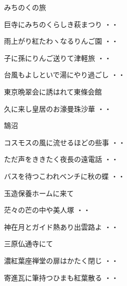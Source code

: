 \vspace{0.6cm}
みちのくの旅
\begin{shiika}巨寺にみちのくらしき萩まつり
\hfill{・・}\end{shiika}
\begin{shiika}雨上がり紅たわヽなるりんご園
\hfill{・・}\end{shiika}
\begin{shiika}子に孫にりんご送りて津軽旅
\hfill{・・}\end{shiika}
\begin{shiika}台風もよしといで湯にやり過ごし
\hfill{・・}\end{shiika}
\vspace{0.6cm}
東京晩翠会に誘はれて東條会館
\begin{shiika}久に来し皇居のお濠曼珠沙華
\hfill{・・}\end{shiika}
\vspace{0.6cm}
鵠沼
\begin{shiika}コスモスの風に流せるほどの些事
\hfill{・・}\end{shiika}
\begin{shiika}ただ声をききたく夜長の遠電話
\hfill{・・}\end{shiika}
\begin{shiika}バスを待つこわれベンチに秋の蝶
\hfill{・・}\end{shiika}
\vspace{0.6cm}
玉造保養ホームに来て
\begin{shiika}茫々の芒の中や美人塚
\hfill{・・}\end{shiika}
\begin{shiika}神在月とガイド熱あり出雲路よ
\hfill{・・}\end{shiika}
\vspace{0.6cm}
三原仏通寺にて
\begin{shiika}濃紅葉座禅堂の扉はかたく閉じ
\hfill{・・}\end{shiika}
\begin{shiika}寄進瓦に筆持つひまも紅葉散る
\hfill{・・}\end{shiika}
\vspace{0.6cm}
